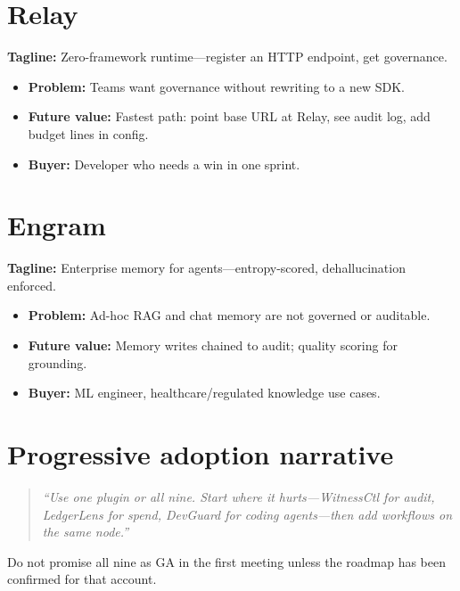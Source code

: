 \section{Relay \statusplan}

\textbf{Tagline:} Zero-framework runtime---register an HTTP endpoint, get governance.

\begin{itemize}
  \item \textbf{Problem:} Teams want governance without rewriting to a new SDK.
  \item \textbf{Future value:} Fastest path: point base URL at Relay, see audit log, add budget lines in config.
  \item \textbf{Buyer:} Developer who needs a win in one sprint.
\end{itemize}

\section{Engram \statusplan}

\textbf{Tagline:} Enterprise memory for agents---entropy-scored, dehallucination enforced.

\begin{itemize}
  \item \textbf{Problem:} Ad-hoc RAG and chat memory are not governed or auditable.
  \item \textbf{Future value:} Memory writes chained to audit; quality scoring for grounding.
  \item \textbf{Buyer:} ML engineer, healthcare/regulated knowledge use cases.
\end{itemize}

\section{Progressive adoption narrative}

\begin{quote}
\emph{``Use one plugin or all nine. Start where it hurts---WitnessCtl for audit, LedgerLens for spend, DevGuard for coding agents---then add workflows on the same node.''}
\end{quote}

Do not promise all nine as GA in the first meeting unless the roadmap has been confirmed for that account.
